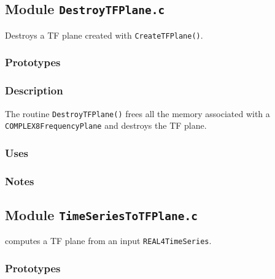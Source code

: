 \vfill{\footnotesize}

\newpage
\subsection{Module \texttt{DestroyTFPlane.c}}
\label{ss:DestroyTFPlane.c}

Destroys a TF plane created with \texttt{CreateTFPlane()}.

\subsubsection*{Prototypes}
\vspace{0.1in}


\subsubsection*{Description}

The routine \verb+DestroyTFPlane()+ frees all the memory associated with a
\verb+COMPLEX8FrequencyPlane+ and destroys the TF plane.

\subsubsection*{Uses}

\subsubsection*{Notes}

\vfill{\footnotesize}

\newpage
\subsection{Module \texttt{TimeSeriesToTFPlane.c}}
\label{ss:TimeSeriesToTFPlane.c}

computes a TF plane from an input 
\verb+REAL4TimeSeries+.

\subsubsection*{Prototypes}
\vspace{0.1in}


